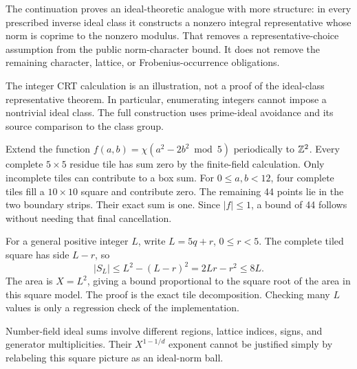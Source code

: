 The continuation proves an ideal-theoretic analogue with more structure: in every prescribed inverse ideal class it constructs a nonzero integral representative whose norm is coprime to the nonzero modulus. That removes a representative-choice assumption from the public norm-character bound. It does not remove the remaining character, lattice, or Frobenius-occurrence obligations.

The integer CRT calculation is an illustration, not a proof of the ideal-class representative theorem. In particular, enumerating integers cannot impose a nontrivial ideal class. The full construction uses prime-ideal avoidance and its source comparison to the class group.

Extend the function $f(a,b)=\chi(a^2-2b^2\bmod5)$ periodically to $\mathbb Z^2$. Every complete $5\times5$ residue tile has sum zero by the finite-field calculation. Only incomplete tiles can contribute to a box sum.
For $0\le a,b<12$, four complete tiles fill a $10\times10$ square and contribute zero. The remaining 44 points lie in the two boundary strips. Their exact sum is one. Since $|f|\le1$, a bound of 44 follows without needing that final cancellation.

For a general positive integer $L$, write $L=5q+r$, $0\le r<5$. The complete tiled square has side $L-r$, so
\[
|S_L|\le L^2-(L-r)^2=2Lr-r^2\le8L.
\]
The area is $X=L^2$, giving a bound proportional to the square root of the area in this square model. The proof is the exact tile decomposition. Checking many $L$ values is only a regression check of the implementation.

Number-field ideal sums involve different regions, lattice indices, signs, and generator multiplicities. Their $X^{1-1/d}$ exponent cannot be justified simply by relabeling this square picture as an ideal-norm ball.

